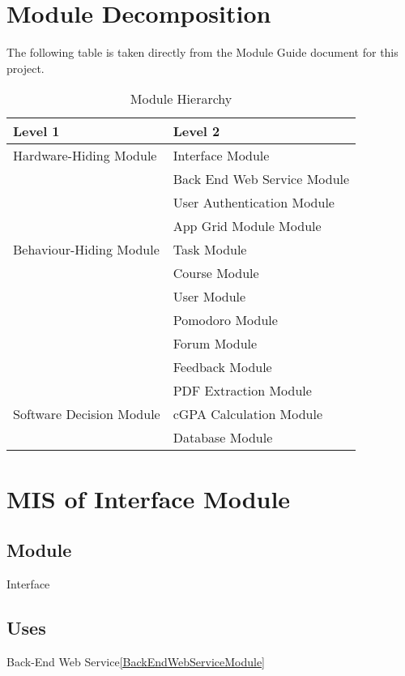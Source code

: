 \documentclass[12pt, titlepage]{article}
\begin{document}
\section{Module Decomposition}

The following table is taken directly from the Module Guide document for this project.

\begin{table}[h!]
\centering
\begin{tabular}{p{} p{}}
\toprule
\textbf{Level 1} & \textbf{Level 2}\\
\midrule

{Hardware-Hiding Module} & Interface Module\\
\midrule

\multirow{7}{0.3\textwidth}{Behaviour-Hiding Module}
& Back End Web Service Module\\
& User Authentication Module\\ 
& App Grid Module Module\\ 
& Task Module\\
& Course Module\\
& User Module\\
& Pomodoro Module\\
& Forum Module\\
& Feedback Module\\
\midrule

\multirow{3}{0.3\textwidth}{Software Decision Module}
& PDF Extraction Module \\
& cGPA Calculation Module \\
& Database Module\\

\bottomrule

\end{tabular}
\caption{Module Hierarchy}
\label{TblMH}
\end{table}


\newpage
\section{MIS of Interface Module} \label{InterfaceModule}

\subsection{Module}
Interface

\subsection{Uses}
Back-End Web Service\ref{BackEndWebServiceModule}
\end{document}
